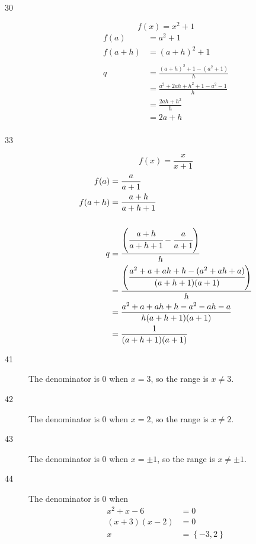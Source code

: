 \documentclass{exam}
\begin{document}
\begin{description}
    \pagebreak

    \item[30]
      \[
        f(x) = x^2 + 1
      \]
      \begin{align*}
        f(a)     &= a^2 + 1 \\
        f(a + h) &= (a + h)^2 + 1 \\
        \\
        q &= \frac{(a + h)^2 + 1 - (a^2 + 1)}{h} \\
          &= \frac{a^2 + 2ah + h^2 + 1 - a^2 - 1}{h} \\
          &= \frac{2ah + h^2}{h} \\
          &= 2a + h \\
      \end{align*}

    \item[33]
      \[
        f(x) = \frac{x}{x + 1}
      \]
      \begin{align*}
        f(a)     &= \frac{a}{a + 1} \\
        f(a + h) &= \frac{a + h}{a + h + 1} \\
        \\
        q        &= \frac{\left( \cfrac{a + h}{a + h + 1} - \cfrac{a}{a + 1} \right) }{h} \\
                 &= \frac{\left( \cfrac{a^2 + a + ah + h - (a^2 + ah + a)}{(a + h + 1)(a + 1)} \right)}{h} \\
                 &= \frac{a^2 + a + ah + h - a^2 - ah - a}{h(a + h + 1)(a + 1)} \\
                 &= \frac{1}{(a + h + 1)(a + 1)} \\
      \end{align*}

    \item[41] The denominator is 0 when $x = 3$, so the range is $x \neq 3$.

    \item[42] The denominator is 0 when $x = 2$, so the range is $x \neq 2$.  

    \item[43] The denominator is 0 when $x = \pm 1$, so the range is $x \neq \pm 1$.

    \item[44]
      The denominator is 0 when 
      \begin{align*}
        x^2 + x - 6    &= 0 \\
        (x + 3)(x - 2) &= 0 \\
        x              &= \left\{ -3, 2 \right\} \\
      \end{align*}


\end{description}
\end{document}
